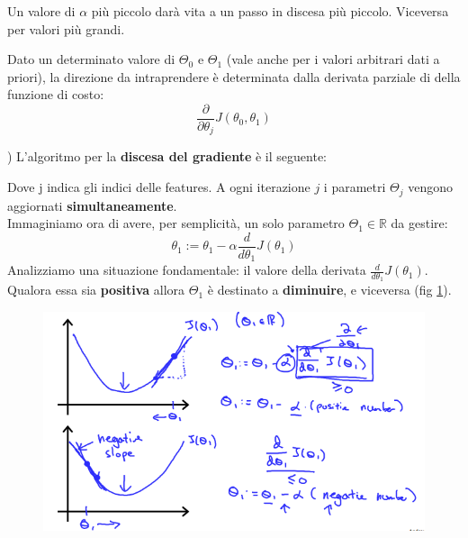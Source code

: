 \begin{definizione}
    Un valore di $\alpha$ più piccolo darà vita a un passo in discesa più piccolo. Viceversa per valori più grandi.
\end{definizione}
\begin{definizione}
Dato un determinato valore di $\Theta_0$ e $\Theta_1$ (vale anche per i valori arbitrari dati a priori), la direzione da intraprendere è determinata dalla derivata parziale di della funzione di costo:
\[ \frac{\partial}{\partial \theta_j} J(\theta_0, \theta_1)\]
\end{definizione})  
L'algoritmo per la \textbf{discesa del gradiente} è il seguente:
\begin{algorithm}[H]
\begin{algorithmic}
    \EndFor
    \EndWhile
    \end{algorithmic}
\end{algorithm}
Dove j indica gli indici delle features. A ogni iterazione $j$ i parametri $\Theta_j$ vengono aggiornati \textbf{simultaneamente}.\\
Immaginiamo ora di avere, per semplicità, un solo parametro $\Theta_1 \in \mathbb{R}$ da gestire:
\[\theta_1:=\theta_1-\alpha \frac{d}{d\theta_1} J(\theta_1)\]
Analizziamo una situazione fondamentale: il valore della derivata $\frac{d}{d\theta_1} J(\theta_1)$. Qualora essa sia \textbf{positiva} allora $\Theta_1$ è destinato a \textbf{diminuire}, e viceversa (fig \ref{GradientDescent2}).
\begin{figure}[h!]
    \centering
    \includegraphics[width=1\textwidth]{img/SMSIxKGUEeav5QpTGIv-Pg_ad3404010579ac16068105cfdc8e950a_Screenshot-2016-11-03-00.05.06.png}
    \caption{}\label{GradientDescent2}
\end{figure}
